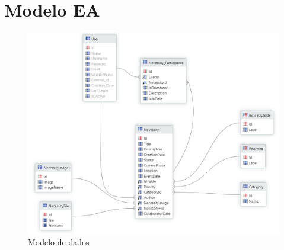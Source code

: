 \documentclass[a4paper,openright,11pt]{report}
\begin{document}
\section*{Modelo EA}\label{sec:db}

\begin{figure}[H]
  \centering 
  \includegraphics[scale=0.4]{figures/DataModel.png}
  \caption{Modelo de dados}\label{fig:datamodel}
\end{figure}

\end{document}
